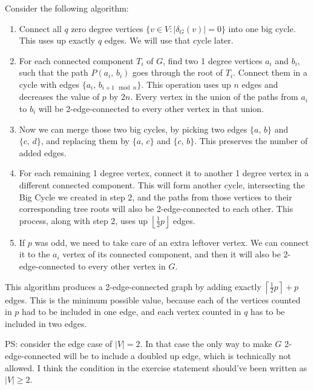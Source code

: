 \documentclass{article}
\begin{document}
  Consider the following algorithm:
  \begin{enumerate}
    \item Connect all $q$ zero degree vertices $\{v \in V : |\delta_G(v)| = 0\}$ into one big cycle.
    This uses up exactly $q$ edges.
    We will use that cycle later.

    \item For each connected component $T_i$ of $G$, find two 1 degree vertices $a_i$ and $b_i$,
    such that the path $P(a_i,\, b_i)$ goes through the root of $T_i$.
    Connect them in a cycle with edges $\{a_i,\,b_{i+1 \mod n}\}$.
    This operation uses up $n$ edges and decreases the value of $p$ by $2n$.
    Every vertex in the union of the paths from $a_i$ to $b_i$ will be 2-edge-connected to every other vertex in that union.

    \item Now we can merge those two big cycles, by picking two edges $\{a,\, b\}$ and $\{c,\, d\}$,
    and replacing them by $\{a,\, c\}$ and $\{c,\, b\}$.
    This preserves the number of added edges.

    \item For each remaining 1 degree vertex, connect it to another 1 degree vertex in a different connected component.
    This will form another cycle, intersecting the Big Cycle we created in step 2,
    and the paths from those vertices to their corresponding tree roots will also be 2-edge-connected to each other.
    This process, along with step 2, uses up $\left\lfloor\frac{1}{2} p\right\rfloor$ edges.

    \item If $p$ was odd, we need to take care of an extra leftover vertex.
    We can connect it to the $a_i$ vertex of its connected component,
    and then it will also be 2-edge-connected to every other vertex in $G$.
  \end{enumerate}
  This algorithm produces a 2-edge-connected graph by adding exactly $\left\lceil\frac{1}{2} p\right\rceil + p$ edges.
  This is the minimum possible value, because each of the vertices counted in $p$ had to be included in one edge,
  and each vertex counted in $q$ has to be included in two edges.

  PS: consider the edge case of $|V| = 2$.
  In that case the only way to make $G$ 2-edge-connected will be to include a doubled up edge,
  which is technically not allowed.
  I think the condition in the exercise statement should've been written as $|V| \geq 2$.
\end{document}

